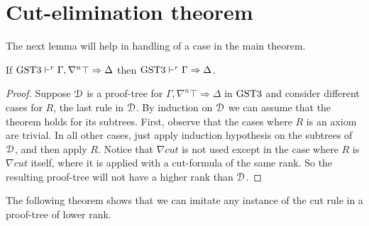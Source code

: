 \documentclass[10pt,a4paper]{amsart}
\begin{document}
\section{Cut-elimination theorem}

The next lemma will help in handling of a case in the main theorem.
\begin{lem}\label{lem:gstt-top-redundant}
If $\text{GST3} \vdash^r \Gamma , \nabla^n \top \Rightarrow \Delta$ then $\text{GST3} \vdash^r \Gamma \Rightarrow \Delta$.
\end{lem}
\begin{proof}
	Suppose $\mathcal{D}$ is a proof-tree for $\Gamma , \nabla^n \top \Rightarrow \Delta$ in $\text{GST3}$ and consider different cases for $R$, the last rule in $\mathcal{D}$.
	By induction on $\mathcal{D}$ we can assume that the theorem holds for its subtrees.
	First, observe that the cases where $R$ is an axiom are trivial. In all other cases, just apply induction hypothesis on the subtrees of $\mathcal{D}$, and then apply $R$. Notice that $\nabla cut$ is not used except in the case where $R$ is $\nabla cut$ itself, where it is applied with a cut-formula of the same rank. So the resulting proof-tree will not have a higher rank than $\mathcal{D}$.
\end{proof}

The following theorem shows that we can imitate any instance of the cut rule in a proof-tree of lower rank.
\end{document}
